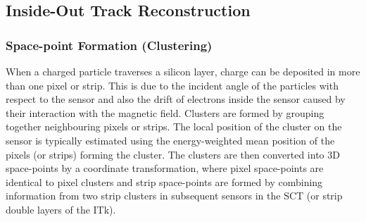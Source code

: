 \subsection{Inside-Out Track Reconstruction}
\label{track-reconstruction}




\subsubsection{Space-point Formation (Clustering)}
When a charged particle traverses a silicon layer, charge can be deposited in more than one pixel or strip. This is due to the incident angle of the particles with respect to the sensor and also the drift of electrons inside the sensor caused by their interaction with the magnetic field. Clusters are formed by grouping together neighbouring pixels or strips. The local position of the cluster on the sensor is typically estimated using the energy-weighted mean position of the pixels (or strips) forming the cluster. The clusters are then converted into 3D space-points by a coordinate transformation, where pixel space-points are identical to pixel clusters and strip space-points are formed by combining information from two strip clusters in subsequent sensors in the SCT (or strip double layers of the ITk).

